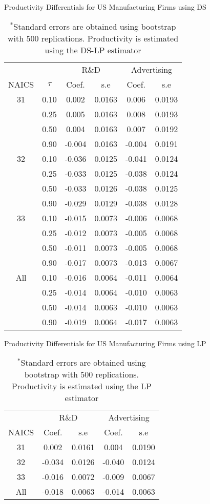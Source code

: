 \documentclass[11pt]{article}
\begin{document}
\begin{table}[H]
\centering
\caption{Productivity Differentials for US Manufacturing Firms using DS}
\begin{tabular}{cccccc}
  \hline\hline & & \multicolumn{2}{c}{R\&D}  & \multicolumn{2}{c}{Advertising} \\ \cmidrule(lr){3-4} \cmidrule(lr){5-6}NAICS & $\tau$ & Coef. & s.e & Coef. & s.e \\ 
  \hline
31 & 0.10 & 0.002 & 0.0163 & 0.006 & 0.0193 \\ 
   & 0.25 & 0.005 & 0.0163 & 0.008 & 0.0193 \\ 
   & 0.50 & 0.004 & 0.0163 & 0.007 & 0.0192 \\ 
   & 0.90 & -0.004 & 0.0163 & -0.004 & 0.0191 \\ 
  32 & 0.10 & -0.036 & 0.0125 & -0.041 & 0.0124 \\ 
   & 0.25 & -0.033 & 0.0125 & -0.038 & 0.0124 \\ 
   & 0.50 & -0.033 & 0.0126 & -0.038 & 0.0125 \\ 
   & 0.90 & -0.029 & 0.0129 & -0.038 & 0.0128 \\ 
  33 & 0.10 & -0.015 & 0.0073 & -0.006 & 0.0068 \\ 
   & 0.25 & -0.012 & 0.0073 & -0.005 & 0.0068 \\ 
   & 0.50 & -0.011 & 0.0073 & -0.005 & 0.0068 \\ 
   & 0.90 & -0.017 & 0.0073 & -0.013 & 0.0067 \\ 
  All & 0.10 & -0.016 & 0.0064 & -0.011 & 0.0064 \\ 
   & 0.25 & -0.014 & 0.0064 & -0.010 & 0.0063 \\ 
   & 0.50 & -0.014 & 0.0063 & -0.010 & 0.0063 \\ 
   & 0.90 & -0.019 & 0.0064 & -0.017 & 0.0063 \\ 
   \hline
\end{tabular}
\caption*{\footnotesize $^{*}$Standard errors are obtained using bootstrap with 500 replications. Productivity is estimated using the DS-LP estimator}
\end{table}

\begin{table}[H]
\centering
\caption{Productivity Differentials for US Manufacturing Firms using LP}
\begin{tabular}{ccccc}
  \hline\hline & \multicolumn{2}{c}{R\&D}  & \multicolumn{2}{c}{Advertising} \\ \cmidrule(lr){2-3} \cmidrule(lr){4-5}NAICS & Coef. & s.e & Coef. & s.e \\ 
  \hline
31 & 0.002 & 0.0161 & 0.004 & 0.0190 \\ 
  32 & -0.034 & 0.0126 & -0.040 & 0.0124 \\ 
  33 & -0.016 & 0.0072 & -0.009 & 0.0067 \\ 
  All & -0.018 & 0.0063 & -0.014 & 0.0063 \\ 
   \hline
\end{tabular}
\caption*{\footnotesize $^{*}$Standard errors are obtained using bootstrap with 500 replications. Productivity is estimated using the LP estimator}
\end{table}
\end{document}
